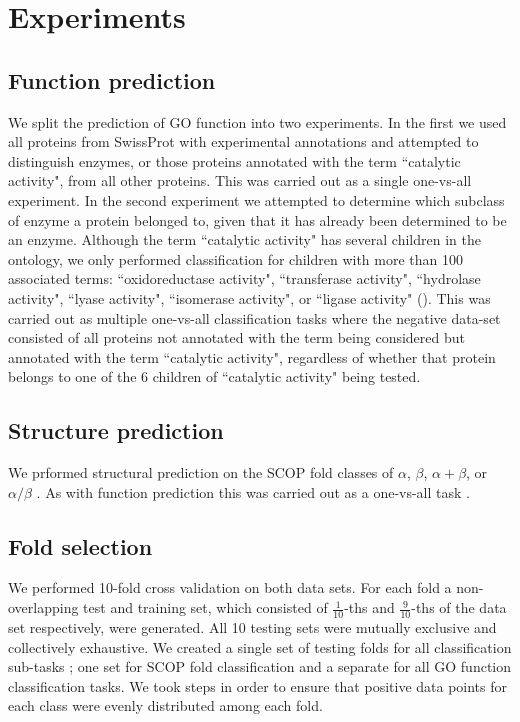 \section{Experiments}


\subsection{Function prediction}
We split the prediction of GO function into two experiments.  In the first we used all proteins from SwissProt with experimental annotations and attempted to distinguish enzymes, or those proteins annotated with the term ``catalytic activity", from all other proteins.  This was carried out as a single one-vs-all experiment.  In the second experiment we attempted to determine which subclass of enzyme a protein belonged to, given that it has already been determined to be an enzyme.  Although the term ``catalytic activity" has several children in the ontology, we only performed classification for children with more than 100 associated terms: ``oxidoreductase activity", ``transferase activity", ``hydrolase activity", ``lyase activity", ``isomerase activity", or ``ligase activity" (). This was carried out as multiple one-vs-all classification tasks where the negative data-set consisted of all proteins not annotated with the term being considered but annotated with the term ``catalytic activity", regardless of whether that protein belongs to one of the 6 children of ``catalytic activity" being tested.


\subsection{Structure prediction}

We prformed structural prediction on the SCOP fold classes of $\alpha$, $\beta$, $\alpha+\beta$, or $\alpha/\beta$ \citep{murzin1995scop}.  As with function prediction this was carried out as a one-vs-all task .


\subsection{Fold selection}

We performed 10-fold cross validation on both data sets. For each fold a non-overlapping test and training set, which consisted of $\frac{1}{10}$-ths and $\frac{9}{10}$-ths of the data set respectively, were generated. All 10 testing sets were mutually exclusive and collectively exhaustive.  We created a single set of testing folds for all classification sub-tasks ; one set for SCOP fold classification and a separate for all GO function classification tasks.  We took steps in order to ensure that positive data points for each class were evenly distributed among each fold.  


